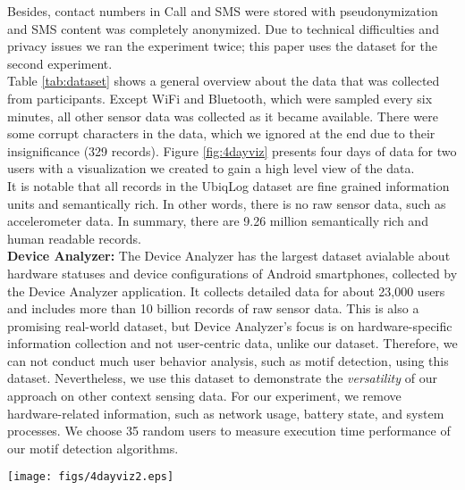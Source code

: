 \documentclass{sig-alternate}
\begin{document}
\normalsize
Besides, contact numbers in Call and SMS were stored with pseudonymization and SMS content was completely anonymized. Due to technical difficulties and privacy issues we ran the experiment twice; this paper uses the dataset for the second experiment. \\
Table \ref{tab:dataset} shows a general overview about the data that was collected from participants. Except WiFi and Bluetooth, which were sampled every six minutes, all other sensor data was collected as it became available. There were some corrupt characters in the data, which we ignored at the end due to their insignificance (329 records). Figure \ref{fig:4dayviz} presents four days of data for two users with a visualization we created to gain a high level view of the data.\\
It is notable that all records in the UbiqLog dataset are fine grained information units and semantically rich. In other words, there is no raw sensor data, such as accelerometer data. In summary, there are 9.26 million semantically rich and human readable records.\\
\textbf{Device Analyzer:} The Device Analyzer \cite{deviceanalyzer} has the largest dataset avialable about hardware statuses and device configurations of Android smartphones, collected by the Device Analyzer application. It collects detailed data for about 23,000 users and includes more than 10 billion records of raw sensor data. This is also a promising real-world dataset, but Device Analyzer's focus is on hardware-specific information collection and not user-centric data, unlike our dataset. Therefore, we can not conduct much user behavior analysis, such as motif detection, using this dataset. Nevertheless, we use this dataset to demonstrate the \emph{versatility} of our approach on other context sensing data. For our experiment, we remove hardware-related information, such as network usage, battery state, and system processes. We choose 35 random users to measure execution time performance of our motif detection algorithms. \\
\begin{figure*}[htb]
\begin{center}
\hbox{\hspace{-2ex}\texttt{[image: figs/4dayviz2.eps]}}
\caption{ \small Two day visualization of two different user data. The top two belongs to User 1 and bottom ones belongs to User 2. (best viewed in color) }\label{fig:4dayviz}
\end{center}
\vspace{-0.6cm}
\end{figure*}
\vspace{-0.5cm}
\end{document}
